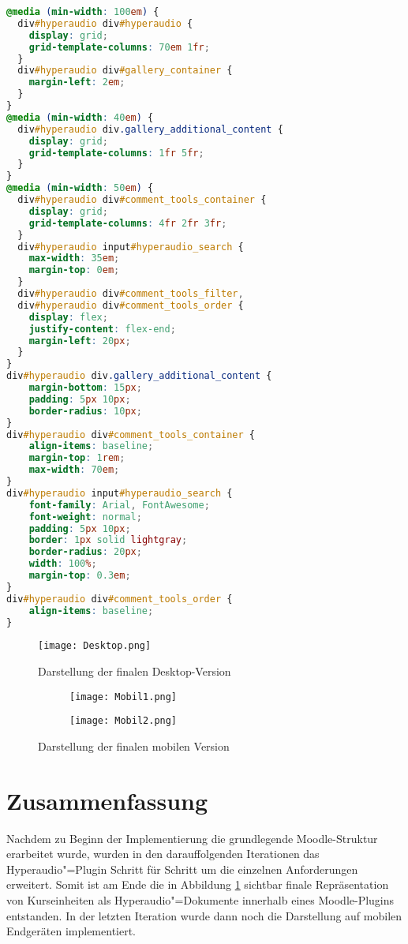 \begin{lstlisting}[language=css,
             linewidth=\textwidth,
             caption={Ausschnitt der \textbf{styles.css} in der 12. Iteration},
             label={lst:it12:styles}]
@media (min-width: 100em) {
  div#hyperaudio div#hyperaudio {
    display: grid;
    grid-template-columns: 70em 1fr;
  }
  div#hyperaudio div#gallery_container {
    margin-left: 2em;
  }
}
@media (min-width: 40em) {
  div#hyperaudio div.gallery_additional_content {
    display: grid;
    grid-template-columns: 1fr 5fr;
  }
}
@media (min-width: 50em) {
  div#hyperaudio div#comment_tools_container {
    display: grid;
    grid-template-columns: 4fr 2fr 3fr;
  }
  div#hyperaudio input#hyperaudio_search {
  	max-width: 35em;
  	margin-top: 0em;
  }
  div#hyperaudio div#comment_tools_filter,
  div#hyperaudio div#comment_tools_order {
  	display: flex;
    justify-content: flex-end;
    margin-left: 20px;
  }
}
div#hyperaudio div.gallery_additional_content {
    margin-bottom: 15px;
    padding: 5px 10px;
    border-radius: 10px;
}
div#hyperaudio div#comment_tools_container {
    align-items: baseline;
    margin-top: 1rem;
    max-width: 70em;
}
div#hyperaudio input#hyperaudio_search {
    font-family: Arial, FontAwesome;
    font-weight: normal;
    padding: 5px 10px;
    border: 1px solid lightgray;
    border-radius: 20px;
    width: 100%;
    margin-top: 0.3em;
}
div#hyperaudio div#comment_tools_order {
    align-items: baseline;
}
\end{lstlisting}

\begin{figure}[h!]
\texttt{[image: Desktop.png]}
\caption{\label{fig:DesktopFinal}Darstellung der finalen Desktop-Version}
\end{figure}

\begin{figure}[h!]
\begin{subfigure}[c]{0.5\textwidth}
\texttt{[image: Mobil1.png]}
\end{subfigure}%
\begin{subfigure}[c]{0.5\textwidth}
\texttt{[image: Mobil2.png]}
\end{subfigure}
\caption{Darstellung der finalen mobilen Version}
\label{fig:MobilFinal}
\end{figure}

\FloatBarrier

\section{Zusammenfassung}
Nachdem zu Beginn der Implementierung die grundlegende Moodle-Struktur erarbeitet wurde, wurden in den darauffolgenden Iterationen das Hyperaudio"=Plugin Schritt für Schritt um die einzelnen Anforderungen erweitert. Somit ist am Ende die in Abbildung \ref{fig:DesktopFinal} sichtbar finale Repräsentation von Kurseinheiten als Hyperaudio"=Dokumente innerhalb eines Moodle-Plugins entstanden. In der letzten Iteration wurde dann noch die Darstellung auf mobilen Endgeräten implementiert.
